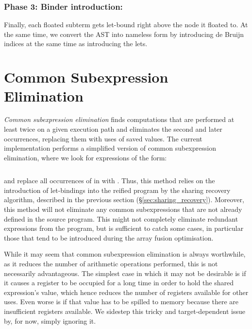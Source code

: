 \subsubsection*{Phase 3: Binder introduction:}

Finally, each floated subterm gets let-bound right above the node it floated to.
At the same time, we convert the AST into nameless  form by
introducing de Bruijn indices at the same time as introducing the lets.


\section{Common Subexpression Elimination}
\label{sec:cse}

\emph{Common subexpression elimination} finds computations that are performed at
least twice on a given execution path and eliminates the second and later
occurrences, replacing them with uses of saved values. The current
implementation performs a simplified version of common subexpression
elimination, where we look for expressions of the form:
%
\begin{lstlisting}[style=Haskell,numbers=none]
%\bf$\langle$ common subexpression elimination $\rangle$% let x = e1 in [x/e1]e2
\end{lstlisting}
%
and replace all occurrences of  in  with . Thus, this method relies on the
introduction of let-bindings into the reified program by the sharing recovery algorithm, described
in the previous section (\S\ref{sec:sharing_recovery}). Moreover, this method will not eliminate any
common subexpressions that are not already defined in the source program. This might not completely
eliminate redundant expressions from the program, but is sufficient to catch some cases, in
particular those that tend to be introduced during the array fusion optimisation.

While it may seem that common subexpression elimination is always worthwhile, as
it reduces the number of arithmetic operations performed, this is not
necessarily advantageous. The simplest case in which it may not be desirable is
if it causes a register to be occupied for a long time in order to hold the
shared expression's value, which hence reduces the number of registers available
for other uses. Even worse is if that value has to be spilled to memory because
there are insufficient registers available. We sidestep this tricky and
target-dependent issue by, for now, simply ignoring it.


